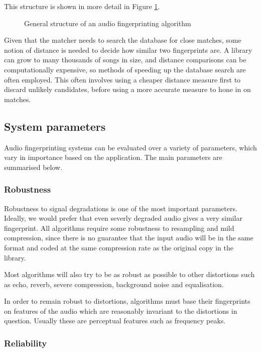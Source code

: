 \documentclass[12pt,a4paper,twoside,openright]{report}
\begin{document}
This structure is shown in more detail in Figure \ref{fig:generalframework}. 

\begin{figure}[h]
  \centering
  
  \caption{General structure of an audio fingerprinting algorithm}
  \label{fig:generalframework}
\end{figure}

Given that the matcher needs to search the database for close matches, some notion of distance is needed to decide how similar two fingerprints are. A library can grow to many thousands of songs in size, and distance comparisons can be computationally expensive, so methods of speeding up the database search are often employed. This often involves using a cheaper distance measure first to discard unlikely candidates, before using a more accurate measure to hone in on matches.


\subsection{System parameters}
\label{section:systemparams}

Audio fingerprinting systems can be evaluated over a variety of parameters, which vary in importance based on the application. The main parameters are summarised below.

\subsubsection{Robustness}

Robustness to signal degradations is one of the most important parameters. Ideally, we would prefer that even severly degraded audio gives a very similar fingerprint. All algorithms require some robustness to resampling and mild compression, since there is no guarantee that the input audio will be in the same format and coded at the same compression rate as the original copy in the library.

Most algorithms will also try to be as robust as possible to other distortions such as echo, reverb, severe compression, background noise and equalisation.

In order to remain robust to distortions, algorithms must base their fingerprints on features of the audio which are reasonably invariant to the distortions in question. Usually these are perceptual features such as frequency peaks.

\subsubsection{Reliability}
\end{document}

